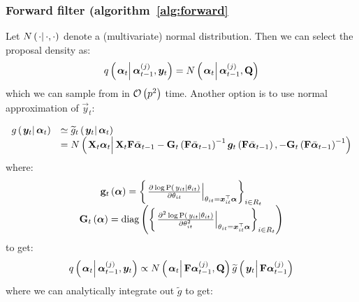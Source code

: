 \subsubsection*{Forward filter (algorithm~\ref{alg:forward}}
Let $\normalC{\cdot}{\cdot}{\cdot}$ denote a (multivariate) normal distribution. Then we can select the proposal density as:
\begin{equation}
	\IDC{\vec{\alpha}_t}{\partic{\vec{\alpha}}{t-1}{j}, \vec{y}_t} = %
		\normalC{\vec{\alpha}_t}{\partic{\vec{\alpha}}{t-1}{j}}{\mat{Q}}
\end{equation}%
%
which we can sample from in $\mathcal{O}\left( p^2\right)$ time. Another option is to use normal approximation of $\vec{y}_t$:

\begin{equation}\begin{array}{cl}
	\optorC{g}{\vec{y}_t}{\vec{\alpha}_t} & \simeq  \optorC{\widetilde{g}_t}{\vec{y}_t}{\vec{\alpha}_t} \\ &= %
		\normalC{
			\mat{X}_t\vec{\alpha}_t
		}{ %
			\mat{X}_t\mat{F}\vecb{\alpha}_{t - 1} - 
			\mat{G}_t\Lparen{\mat{F}\vecb{\alpha}_{t - 1}}^{-1}
			\vec{g}_t\Lparen{\mat{F}\vecb{\alpha}_{t - 1}}		
		}{ %
			- \mat{G}_t\Lparen{\mat{F}\vecb{\alpha}_{t - 1}}^{-1}
		}
\end{array}\end{equation}
%
% 
where:
\begin{equation}\begin{array}{c}
\mat{g}_t\Lparen{\vec{\alpha}} = 
		\Lbrace{\left.\frac{
		\partial \log \propC{y_{it}}{\theta_{it}}
	}{
		\partial\theta_{it}
	}\right|_{\theta_{it} = \vec{x}_{it}^\top\vec{\alpha}} }_{i \in R_t} \\
%
	\mat{G}_t\Lparen{\vec{\alpha}} = 
		\diag{\Lbrace{\left.\frac{
		\partial^2 \log \propC{y_{it}}{\theta_{it}}
	}{
		\partial\theta_{it}^2
	}\right|_{\theta_{it} = \vec{x}_{it}^\top\vec{\alpha}} }_{i \in R_t}}
\end{array}\end{equation}
%
%
to get:
\begin{equation}
	\IDC{\vec{\alpha}_t}{\partic{\vec{\alpha}}{t-1}{j}, \vec{y}_t} \propto %
		\normalC{\vec{\alpha}_t}{\mat{F}\partic{\vec{\alpha}}{t-1}{j}}{\mat{Q}}
		\optorC{\widetilde{g}}{\vec{y}_t}{\mat{F}\partic{\vec{\alpha}}{t-1}{j}}
\end{equation}
%
%
where we can analytically integrate out $\widetilde{g}$ to get:
